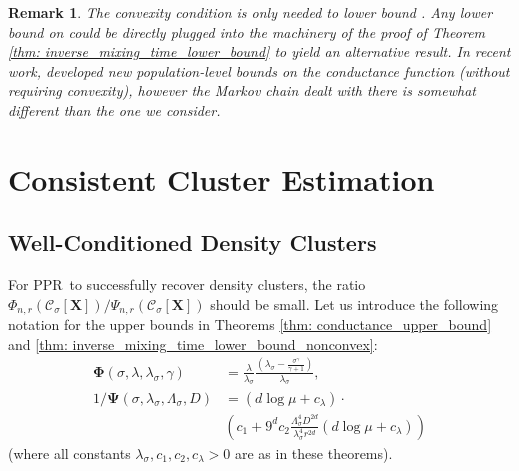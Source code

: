 \documentclass{article}
\newcommand{\1}{\mathbf{1}}
\newcommand{\Xbf}{\mathbf{X}}
\newcommand{\Pbb}{\mathbb{P}}
\newcommand{\Cset}{\mathcal{C}}
\newcommand{\Csig}{\Cset_{\sigma}}
\newcommand{\pprspace}{{\sc PPR~}}
\theoremstyle{aldenthm}
\theoremstyle{aldenrmrk}
\newtheorem{remark}{Remark}
\begin{document}
\begin{remark}
  The convexity condition is only needed to lower bound 
  \smash{$\widetilde{\Phi}_{\Pbb,r}$}. Any lower bound on
  \smash{$\widetilde{\Phi}_{\Pbb,r}$} could be directly plugged into the 
  machinery of the proof of Theorem \ref{thm: inverse_mixing_time_lower_bound}
  to yield an alternative result. In recent work, \citep{abbasi-yadkori2016} developed new
  population-level bounds on the conductance function (without requiring
  convexity), however the Markov chain dealt with there is somewhat different 
  than the one we consider.    
\end{remark}

\section{Consistent Cluster Estimation}
\label{sec: consistent_cluster_estimation_with_ppr}

\subsection{Well-Conditioned Density Clusters}

For \pprspace to successfully recover density clusters, the ratio
$\Phi_{n,r}(\Csig[\Xbf])/\Psi_{n,r}(\Csig[\Xbf])$ should be small.  Let us
introduce the following notation for the upper bounds in Theorems 
\ref{thm: conductance_upper_bound} and \ref{thm:
  inverse_mixing_time_lower_bound_nonconvex}:
\begin{align*}
\mathbf{\Phi}(\sigma, \lambda,\lambda_{\sigma},\gamma) 
&= \frac{\lambda}{\lambda_{\sigma}} \frac{(\lambda_{\sigma} -
  \frac{\sigma^{\gamma}}{\gamma+1})}{\lambda_{\sigma}}, \\
1 / \mathbf{\Psi}(\sigma, \lambda_{\sigma}, \Lambda_{\sigma}, D) 
&= \left(d \log \mu + c_{\lambda} \right) \cdot \\ 
& \left(c_1 + 9^d c_2
  \frac{\Lambda_{\sigma}^4D^{2d}}{\lambda_{\sigma}^4r^{2d}}\left(d \log \mu + 
  c_{\lambda}\right)\right)
\end{align*}
(where all constants $\lambda_\sigma,c_1,c_2, c_\lambda>0$ are as in these 
theorems).
\end{document}
